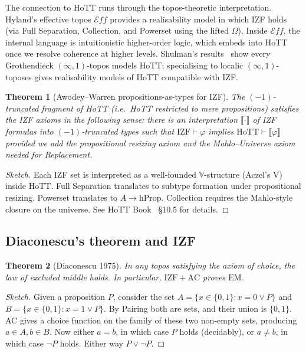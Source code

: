 \documentclass[12pt]{article}
\newtheorem{theorem}{Theorem}[section]
\theoremstyle{definition}
\theoremstyle{remark}
\begin{document}
The connection to HoTT runs through the topos-theoretic interpretation. Hyland's
effective topos $\mathcal{E}\!f\!f$ provides a realisability model in which IZF holds
(via Full Separation, Collection, and Powerset using the lifted $\Omega$). Inside
$\mathcal{E}\!f\!f$, the internal language is intuitionistic higher-order logic, which
embeds into HoTT once we resolve coherence at higher levels. Shulman's results~\cite{Shulman2019} show every Grothendieck $(\infty,1)$-topos models HoTT; specialising
to localic $(\infty,1)$-toposes gives realisability models of HoTT compatible with IZF.

\begin{theorem}[Awodey--Warren propositions-as-types for IZF]
\label{thm:awodey-warren}
The $(-1)$-truncated fragment of HoTT (i.e.\ HoTT restricted to mere propositions)
satisfies the IZF axioms in the following sense: there is an interpretation
$\llbracket\cdot\rrbracket$ of IZF formulas into $(-1)$-truncated types such that
$\mathrm{IZF}\vdash \varphi$ implies $\mathrm{HoTT}\vdash \llbracket\varphi\rrbracket$
provided we add the propositional resizing axiom and the Mahlo--Universe axiom needed for
Replacement.
\end{theorem}
\begin{proof}[Sketch]
Each IZF set is interpreted as a well-founded $\mathbb{V}$-structure
(Aczel's V) inside HoTT. Full Separation translates to subtype formation under
propositional resizing. Powerset translates to $A \to \mathrm{hProp}$. Collection requires
the Mahlo-style closure on the universe. See HoTT Book~\cite{HoTTBook} \S10.5 for details.
\end{proof}

\subsection{Diaconescu's theorem and IZF}

\begin{theorem}[Diaconescu 1975]
\label{thm:diaconescu}
In any topos satisfying the axiom of choice, the law of excluded middle holds. In
particular, $\mathrm{IZF}+\mathrm{AC}$ proves $\mathrm{EM}$.
\end{theorem}
\begin{proof}[Sketch]
Given a proposition $P$, consider the set $A = \{x\in\{0,1\}: x=0 \vee P\}$ and
$B = \{x\in\{0,1\}: x=1\vee P\}$. By Pairing both are sets, and their union is
$\{0,1\}$. AC gives a choice function on the family of these two non-empty sets,
producing $a\in A, b\in B$. Now either $a=b$, in which case $P$ holds (decidably), or
$a\neq b$, in which case $\neg P$ holds. Either way $P\vee\neg P$.
\end{proof}
\end{document}
